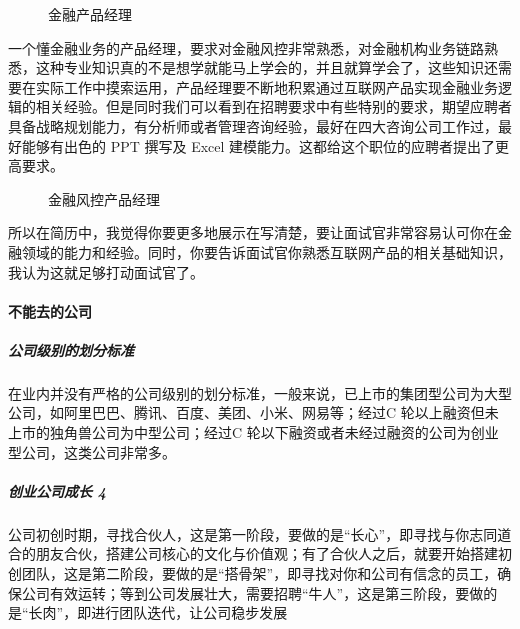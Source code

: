 \documentclass[letterpaper,10pt,english]{sphinxmanual}
\begin{document}
\begin{figure}[H]
\centering
\capstart

\noindent{}
\caption{金融产品经理}\label{\detokenize{chapter_interview/AI_Finance_CV:id4}}\end{figure}

一个懂金融业务的产品经理，要求对金融风控非常熟悉，对金融机构业务链路熟悉，这种专业知识真的不是想学就能马上学会的，并且就算学会了，这些知识还需要在实际工作中摸索运用，产品经理要不断地积累通过互联网产品实现金融业务逻辑的相关经验。但是同时我们可以看到在招聘要求中有些特别的要求，期望应聘者具备战略规划能力，有分析师或者管理咨询经验，最好在四大咨询公司工作过，最好能够有出色的
PPT 撰写及 Excel 建模能力。这都给这个职位的应聘者提出了更高要求。

\begin{figure}[H]
\centering
\capstart

\noindent{}
\caption{金融风控产品经理}\label{\detokenize{chapter_interview/AI_Finance_CV:id5}}\end{figure}

所以在简历中，我觉得你要更多地展示在写清楚，要让面试官非常容易认可你在金融领域的能力和经验。同时，你要告诉面试官你熟悉互联网产品的相关基础知识，我认为这就足够打动面试官了。


\paragraph{不能去的公司}
\label{\detokenize{chapter_interview/not_go:id1}}\label{\detokenize{chapter_interview/not_go::doc}}

\subparagraph{公司级别的划分标准}
\label{\detokenize{chapter_interview/not_go:id2}}
在业内并没有严格的公司级别的划分标准，一般来说，已上市的集团型公司为大型公司，如阿里巴巴、腾讯、百度、美团、小米、网易等；经过C
轮以上融资但未上市的独角兽公司为中型公司；经过C
轮以下融资或者未经过融资的公司为创业型公司，这类公司非常多。


\subparagraph{创业公司成长 4\sphinxfootnotemark[847]}
\label{\detokenize{chapter_interview/not_go:id3}}%
\begin{footnotetext}[847]\sphinxAtStartFootnote
{}
%
\end{footnotetext}\ignorespaces 
公司初创时期，寻找合伙人，这是第一阶段，要做的是“长心”，即寻找与你志同道合的朋友合伙，搭建公司核心的文化与价值观；有了合伙人之后，就要开始搭建初创团队，这是第二阶段，要做的是“搭骨架”，即寻找对你和公司有信念的员工，确保公司有效运转；等到公司发展壮大，需要招聘“牛人”，这是第三阶段，要做的是“长肉”，即进行团队迭代，让公司稳步发展
\end{document}
